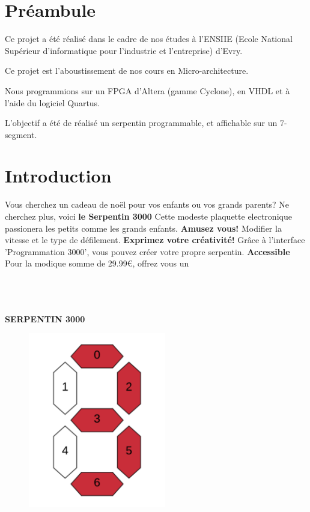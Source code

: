 \documentclass[10pt]{article}
\begin{document}
    \tableofcontents
    \section*{Préambule}
    Ce projet a été réalisé dans le cadre de nos études à l'ENSIIE (Ecole National Supérieur d'informatique pour l'industrie et l'entreprise) d'Evry.
    
    Ce projet est l'aboustissement de nos cours en Micro-architecture.
    
    Nous programmions sur un FPGA d'Altera (gamme Cyclone), en VHDL et à l'aide du logiciel Quartus.
    
    L'objectif a été de réalisé un serpentin programmable, et affichable sur un 7-segment.

    \newpage
    \section{Introduction}
    Vous cherchez un cadeau de noël pour vos enfants ou vos grands parents?
    \newline
    Ne cherchez plus, voici \textbf{le Serpentin 3000}
    \newline
    Cette modeste plaquette electronique passionera les petits comme les grands enfants.
    \newline
    \newline
    \textbf{Amusez vous!}
    \newline
    Modifier la vitesse et le type de défilement.
    \newline
    \newline
    \textbf{Exprimez votre créativité!}
    \newline
    Grâce à l'interface 'Programmation 3000', vous pouvez créer votre propre serpentin.
    \newline
    \newline
    \textbf{Accessible}
    Pour la modique somme de 29.99\euro, offrez vous un\\
    \\
    \\
    \\
    \centerline{\textbf{SERPENTIN 3000}}
    \newline
    \newline
    \begin{figure}[h!]
        \includegraphics[width=6cm]{logo.png}
    \end{figure}
\end{document}
